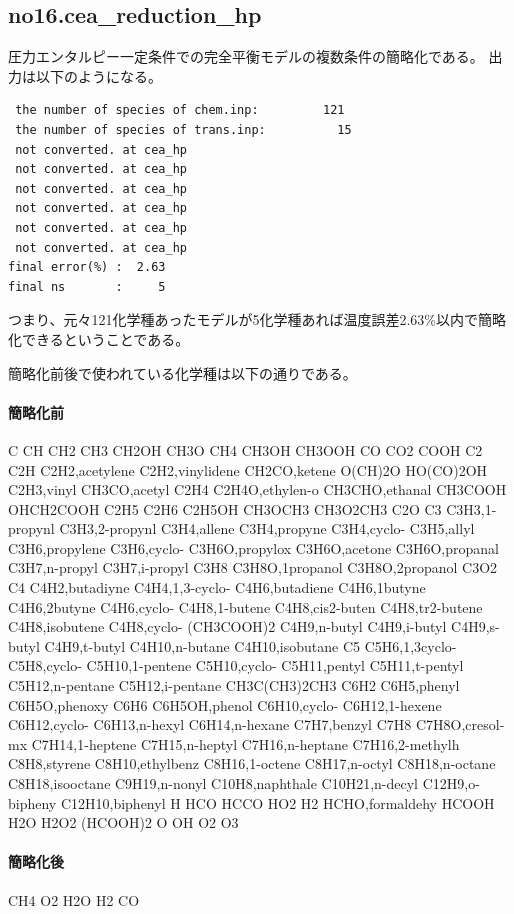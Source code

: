 \documentclass{jsarticle}
\begin{document}
\subsection{no16.cea\_reduction\_hp}%
圧力エンタルピー一定条件での完全平衡モデルの複数条件の簡略化である。
出力は以下のようになる。
\begin{verbatim}
 the number of species of chem.inp:         121
 the number of species of trans.inp:          15
 not converted. at cea_hp
 not converted. at cea_hp
 not converted. at cea_hp
 not converted. at cea_hp
 not converted. at cea_hp
 not converted. at cea_hp
final error(%) :  2.63
final ns       :     5
\end{verbatim}
つまり、元々121化学種あったモデルが5化学種あれば温度誤差2.63\%以内で簡略化できるということである。

簡略化前後で使われている化学種は以下の通りである。

\paragraph{簡略化前}
 C CH CH2 CH3 CH2OH CH3O CH4 CH3OH CH3OOH CO CO2 COOH
 C2 C2H C2H2,acetylene C2H2,vinylidene CH2CO,ketene
 O(CH)2O HO(CO)2OH C2H3,vinyl CH3CO,acetyl C2H4 C2H4O,ethylen-o
 CH3CHO,ethanal CH3COOH OHCH2COOH C2H5 C2H6 C2H5OH CH3OCH3
 CH3O2CH3 C2O C3 C3H3,1-propynl C3H3,2-propynl C3H4,allene
 C3H4,propyne C3H4,cyclo- C3H5,allyl C3H6,propylene
 C3H6,cyclo- C3H6O,propylox C3H6O,acetone C3H6O,propanal
 C3H7,n-propyl C3H7,i-propyl C3H8 C3H8O,1propanol C3H8O,2propanol
 C3O2 C4 C4H2,butadiyne C4H4,1,3-cyclo- C4H6,butadiene
 C4H6,1butyne C4H6,2butyne C4H6,cyclo- C4H8,1-butene
 C4H8,cis2-buten C4H8,tr2-butene C4H8,isobutene C4H8,cyclo-
 (CH3COOH)2 C4H9,n-butyl C4H9,i-butyl C4H9,s-butyl C4H9,t-butyl
 C4H10,n-butane C4H10,isobutane C5 C5H6,1,3cyclo- C5H8,cyclo-
 C5H10,1-pentene C5H10,cyclo- C5H11,pentyl C5H11,t-pentyl
 C5H12,n-pentane C5H12,i-pentane CH3C(CH3)2CH3 C6H2
 C6H5,phenyl C6H5O,phenoxy C6H6 C6H5OH,phenol C6H10,cyclo-
 C6H12,1-hexene C6H12,cyclo- C6H13,n-hexyl C6H14,n-hexane
 C7H7,benzyl C7H8 C7H8O,cresol-mx C7H14,1-heptene C7H15,n-heptyl
 C7H16,n-heptane C7H16,2-methylh C8H8,styrene C8H10,ethylbenz
 C8H16,1-octene C8H17,n-octyl C8H18,n-octane C8H18,isooctane
 C9H19,n-nonyl C10H8,naphthale C10H21,n-decyl C12H9,o-bipheny
 C12H10,biphenyl H HCO HCCO HO2 H2 HCHO,formaldehy HCOOH
 H2O H2O2 (HCOOH)2 O OH O2 O3
\paragraph{簡略化後}
 CH4 O2 H2O H2 CO
\end{document}
